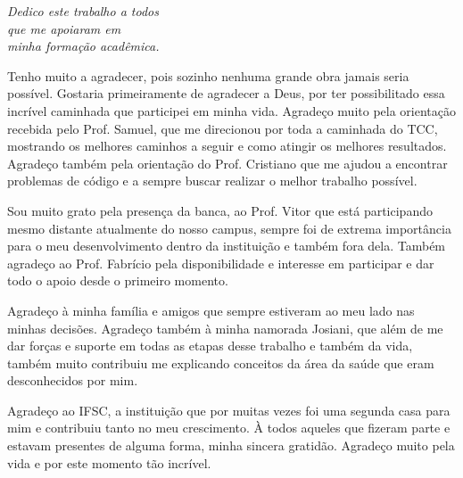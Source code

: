 \documentclass[
	10pt,				%
	oneside,
	a4paper,			%
	chapter=TITLE,		%
	english,			%
	brazil				%
	]{abntex2}
\begin{document}
  

\begin{dedicatoria}
   \vspace*{\fill}
   \begin{flushright}
   \noindent
   \textit{Dedico este trabalho a todos \\ que me apoiaram em \\ minha formação acadêmica.}\vspace*{2cm}
   \end{flushright}
\end{dedicatoria}

\begin{agradecimentos}

Tenho muito a agradecer, pois sozinho nenhuma grande obra jamais seria possível. Gostaria primeiramente de agradecer a Deus, por ter possibilitado essa incrível caminhada que participei em minha vida. Agradeço muito pela orientação recebida pelo Prof. Samuel, que me direcionou por toda a caminhada do TCC, mostrando os melhores caminhos a seguir e como atingir os melhores resultados. Agradeço também pela orientação do Prof. Cristiano que me ajudou a encontrar problemas de código e a sempre buscar realizar o melhor trabalho possível.

Sou muito grato pela presença da banca, ao Prof. Vitor que está participando mesmo distante atualmente do nosso campus, sempre foi de extrema importância para o meu desenvolvimento dentro da instituição e também fora dela. Também agradeço ao Prof. Fabrício pela disponibilidade e interesse em participar e dar todo o apoio desde o primeiro momento.

Agradeço à minha família e amigos que sempre estiveram ao meu lado nas minhas decisões. Agradeço também à minha namorada Josiani, que além de me dar forças e suporte em todas as etapas desse trabalho e também da vida, também muito contribuiu me explicando conceitos da área da saúde que eram desconhecidos por mim.

Agradeço ao IFSC, a instituição que por muitas vezes foi uma segunda casa para mim e contribuiu tanto no meu crescimento. À todos aqueles que fizeram parte e estavam presentes de alguma forma, minha sincera gratidão. Agradeço muito pela vida e por este momento tão incrível.

\end{agradecimentos}
\end{document}
